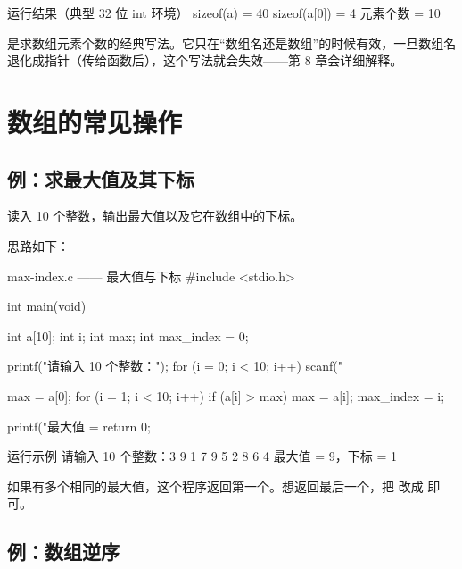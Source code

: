 \begin{outbox}{运行结果（典型 32 位 int 环境）}
sizeof(a)    = 40
sizeof(a[0]) = 4
元素个数     = 10
\end{outbox}

 是求数组元素个数的经典写法。它只在“数组名还是数组”的时候有效，一旦数组名退化成指针（传给函数后），这个写法就会失效——第 8 章会详细解释。

\section{数组的常见操作}

\subsection{例：求最大值及其下标}

\begin{example}
读入 10 个整数，输出最大值以及它在数组中的下标。
\end{example}
\begin{solution}
思路如下：

\begin{codebox}{max-index.c —— 最大值与下标}
#include <stdio.h>

int main(void)
{
    int a[10];
    int i;
    int max;
    int max_index = 0;

    printf("请输入 10 个整数：");
    for (i = 0; i < 10; i++) {
        scanf("%
    }

    max = a[0];
    for (i = 1; i < 10; i++) {
        if (a[i] > max) {
            max = a[i];
            max_index = i;
        }
    }

    printf("最大值 = %
    return 0;
}
\end{codebox}

\begin{outbox}{运行示例}
请输入 10 个整数：3 9 1 7 9 5 2 8 6 4
最大值 = 9，下标 = 1
\end{outbox}

如果有多个相同的最大值，这个程序返回第一个。想返回最后一个，把 \code{>} 改成 \code{>=} 即可。
\end{solution}

\subsection{例：数组逆序}

